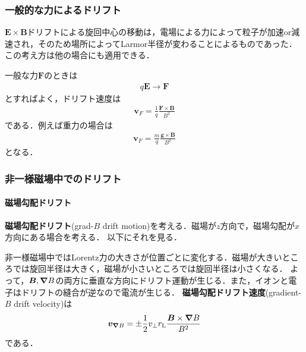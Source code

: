\documentclass{report}
\begin{document}
      \subsubsection{一般的な力によるドリフト}
        $\bm{E}\times\bm{B}$ドリフトによる旋回中心の移動は，電場による力によって粒子が加速or減速され，そのため場所によってLarmor半径が変わることによるものであった．
        この考え方は他の場合にも適用できる．

        一般な力$\bm{F}$のときは
        \begin{align}
          q\bm{E} \to \bm{F}
        \end{align}
        とすればよく，ドリフト速度は
        \begin{align}
          \bm{v}_{F} = \frac{1}{q}\frac{\bm{F}\times\bm{B}}{B^2}
        \end{align}
        である．例えば重力の場合は
        \begin{align}
          \bm{v}_{F} = \frac{m}{q}\frac{\bm{g}\times\bm{B}}{B^2}
        \end{align}
        となる．
      
      \subsubsection{非一様磁場中でのドリフト}
        \paragraph{磁場勾配ドリフト}
          \textbf{磁場勾配ドリフト}(grad-$B$ drift motion)を考える．磁場が$z$方向で，磁場勾配が$x$方向にある場合を考える．
          以下にそれを見る．

          非一様磁場中ではLorentz力の大きさが位置ごとに変化する．磁場が大きいところでは旋回半径は大きく，磁場が小さいところでは旋回半径は小さくなる．
          よって，$\bm{B},\grad B$の両方に垂直な方向にドリフト運動が生じる．また，イオンと電子はドリフトの縫合が逆なので電流が生じる．
          \textbf{磁場勾配ドリフト速度}(gradient-$B$ drift velocity)は
          \begin{align}
            \bm{v}_{\grad B} = \pm \frac{1}{2} v_{\perp} r_{\mathrm{L}} \frac{\bm{B} \times \grad B}{B^2}
          \end{align}
          である．
\end{document}
